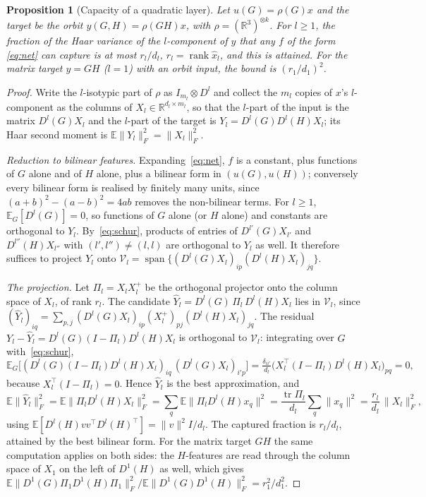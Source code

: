 \documentclass[a4paper,11pt]{article}
\newtheorem{proposition}{Proposition}
\theoremstyle{remark}
\theoremstyle{definition}
\newcommand{\R}{\mathbb{R}}
\newcommand{\E}{\mathbb{E}}
\newcommand{\tr}{\operatorname{tr}}
\begin{document}
\begin{proposition}[Capacity of a quadratic layer]\label{prop:capacity}
Let $u(G)=\rho(G)x$ and the target be the orbit $y(G,H)=\rho(GH)x$, with
$\rho=(\R^3)^{\otimes k}$. For $l\ge1$, the fraction of the Haar variance of
the $l$-component of $y$ that any $f$ of the form \eqref{eq:net} can capture is
at most $r_l/d_l$, $r_l=\operatorname{rank}\hat x_l$, and this is attained.
For the matrix target $y=GH$ ($l=1$) with an orbit input, the bound is
$(r_1/d_1)^2$.
\end{proposition}

\begin{proof}
Write the $l$-isotypic part of $\rho$ as $I_{m_l}\otimes D^l$ and collect the $m_l$
copies of $x$'s $l$-component as the columns of $X_l\in\R^{d_l\times m_l}$, so that
the $l$-part of the input is the matrix $D^l(G)X_l$ and the $l$-part of the target
is $Y_l=D^l(G)D^l(H)X_l$; its Haar second moment is $\E\|Y_l\|_F^2=\|X_l\|_F^2$.

\emph{Reduction to bilinear features.} Expanding~\eqref{eq:net}, $f$ is a constant,
plus functions of $G$ alone and of $H$ alone, plus a bilinear form in
$(u(G),u(H))$; conversely every bilinear form is realised by finitely many units,
since $(a+b)^2-(a-b)^2=4ab$ removes the non-bilinear terms. For $l\ge1$,
$\E_G[D^l(G)]=0$, so functions of $G$ alone (or $H$ alone) and constants are
orthogonal to $Y_l$. By~\eqref{eq:schur}, products of entries of $D^{l'}(G)X_{l'}$
and $D^{l''}(H)X_{l''}$ with $(l',l'')\ne(l,l)$ are orthogonal to $Y_l$ as well. It
therefore suffices to project $Y_l$ onto
$\mathcal V_l=\operatorname{span}\{(D^l(G)X_l)_{ip}(D^l(H)X_l)_{jq}\}$.

\emph{The projection.} Let $\Pi_l=X_lX_l^+$ be the orthogonal projector onto the
column space of $X_l$, of rank $r_l$. The candidate
$\hat Y_l=D^l(G)\,\Pi_l\,D^l(H)X_l$ lies in $\mathcal V_l$, since
$(\hat Y_l)_{iq}=\sum_{p,j}(D^l(G)X_l)_{ip}(X_l^+)_{pj}(D^l(H)X_l)_{jq}$. The
residual $Y_l-\hat Y_l=D^l(G)(I-\Pi_l)D^l(H)X_l$ is orthogonal to $\mathcal V_l$:
integrating over $G$ with~\eqref{eq:schur},
\[
\E_G\bigl[(D^l(G)(I-\Pi_l)D^l(H)X_l)_{iq}\,(D^l(G)X_l)_{i'p}\bigr]
=\tfrac{\delta_{ii'}}{d_l}\bigl(X_l^\top(I-\Pi_l)D^l(H)X_l\bigr)_{pq}=0,
\]
because $X_l^\top(I-\Pi_l)=0$. Hence $\hat Y_l$ is the best approximation, and
\[
\E\|\hat Y_l\|_F^2=\E\|\Pi_lD^l(H)X_l\|_F^2
=\sum_q\E\bigl\|\Pi_lD^l(H)x_q\bigr\|^2=\frac{\tr\Pi_l}{d_l}\sum_q\|x_q\|^2
=\frac{r_l}{d_l}\,\|X_l\|_F^2,
\]
using $\E[D^l(H)vv^\top D^l(H)^\top]=\|v\|^2I/d_l$. The captured fraction is
$r_l/d_l$, attained by the best bilinear form. For the matrix target $GH$ the
same computation applies on both sides: the $H$-features are read through the
column space of $X_1$ on the left of $D^1(H)$ as well, which gives
$\E\|D^1(G)\Pi_1D^1(H)\Pi_1\|_F^2/\E\|D^1(G)D^1(H)\|_F^2=r_1^2/d_1^2$.
\end{proof}
\end{document}
